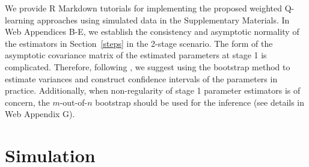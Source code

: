 \documentclass[12pt]{article}
\newtheorem{theorem}{Theorem}
\begin{document}

We provide  R Markdown tutorials for implementing the proposed weighted Q-learning approaches  using simulated data in the Supplementary Materials. In Web Appendices B-E, we establish the consistency and asymptotic normality of the estimators in Section~\ref{steps} in the 2-stage scenario.
The form of the asymptotic covariance matrix of the estimated parameters at stage 1 is complicated. 
Therefore, following \cite{Shao_Wang_2016}, we suggest using the bootstrap method to estimate variances and construct confidence intervals of the parameters in practice. Additionally, when 
non-regularity of stage 1 parameter estimators is of concern, the $m$-out-of-$n$ bootstrap should be used for the inference (see details in Web Appendix G).


\section{Simulation}
\end{document}
